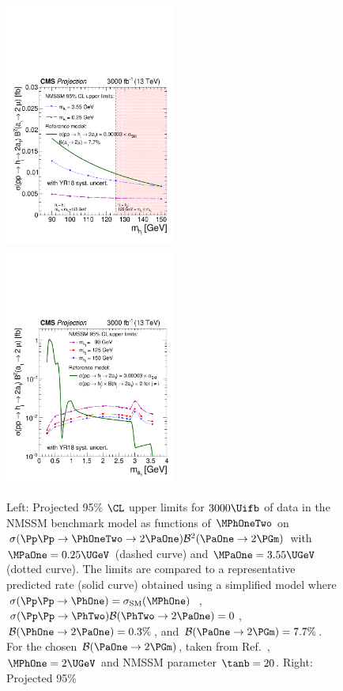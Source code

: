 \begin{figure}
\includegraphics[width=0.5\textwidth]{section9/cms_higgs2a4mu/plots/nmssm_plots_scenario_2/CSxBR_NMSSM_vs_mh_3000.pdf}
\includegraphics[width=0.5\textwidth, clip, trim=0cm 0cm 0cm 0cm]{section9/cms_higgs2a4mu/plots/nmssm_plots_scenario_2/CSxBR_vs_ma_3000.pdf}
\caption{Left: Projected 95\% $\CL$ upper limits for $3000\Uifb$ of data in the NMSSM benchmark model as functions of $\MPhOneTwo$ on ${\sigma(\Pp\Pp \to \PhOneTwo \to 2 \PaOne) \mathcal{B}^2(\PaOne \to 2 \PGm)}$ with $\MPaOne=0.25\UGeV$ (dashed curve)
and $\MPaOne=3.55\UGeV$ (dotted curve).
The limits are compared to a representative predicted rate (solid curve) obtained using a simplified model where
$\sigma (\Pp\Pp \to \PhOne)=\sigma_\mathrm{SM}(\MPhOne)$~\cite{Dittmaier:2011ti},
${\sigma (\Pp\Pp \to \PhTwo) \mathcal{B}(\PhTwo \to 2 \PaOne) = 0}$, $\mathcal{B}(\PhOne \to 2 \PaOne) = 0.3\%$,
and $\mathcal{B}(\PaOne \to 2\PGm) = 7.7\%$. For the chosen $\mathcal{B}(\PaOne \to 2\PGm)$, taken from Ref.~\cite{Dermisek:2010mg}, $\MPhOne = 2\UGeV$ and NMSSM parameter $\tanb = 20$. Right: Projected 95\%}
\label{fig:my_label2}
\end{figure}


